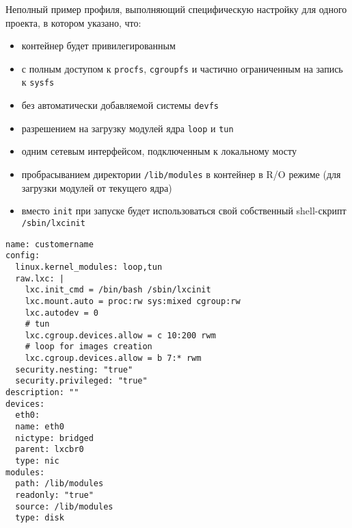 \documentclass[10pt, a5paper]{article}
\begin{document}
Неполный пример профиля, выполняющий специфическую настройку для одного проекта, 
в котором указано, что:
\begin{itemize}
    \item контейнер будет привилегированным
    \item с полным доступом к {\tt procfs}, {\tt cgroupfs} 
        и частично ограниченным на запись к {\tt sysfs}
    \item без автоматически добавляемой системы {\tt devfs}
    \item разрешением на загрузку модулей ядра {\tt loop} и {\tt tun}
    \item одним сетевым интерфейсом, подключенным к локальному мосту
    \item пробрасыванием директории {\tt /lib/modules} в контейнер 
        в R/O режиме (для загрузки модулей от текущего ядра)
    \item вместо {\tt init} при запуске будет использоваться свой 
        собственный shell-скрипт {\tt /sbin/lxcinit}
\end{itemize}

\begin{verbatim}
name: customername
config:
  linux.kernel_modules: loop,tun
  raw.lxc: |
    lxc.init_cmd = /bin/bash /sbin/lxcinit
    lxc.mount.auto = proc:rw sys:mixed cgroup:rw
    lxc.autodev = 0
    # tun
    lxc.cgroup.devices.allow = c 10:200 rwm
    # loop for images creation
    lxc.cgroup.devices.allow = b 7:* rwm
  security.nesting: "true"
  security.privileged: "true"
description: ""
devices:
  eth0:
  name: eth0
  nictype: bridged
  parent: lxcbr0
  type: nic
modules:
  path: /lib/modules
  readonly: "true"
  source: /lib/modules
  type: disk
\end{verbatim}
\end{document}
